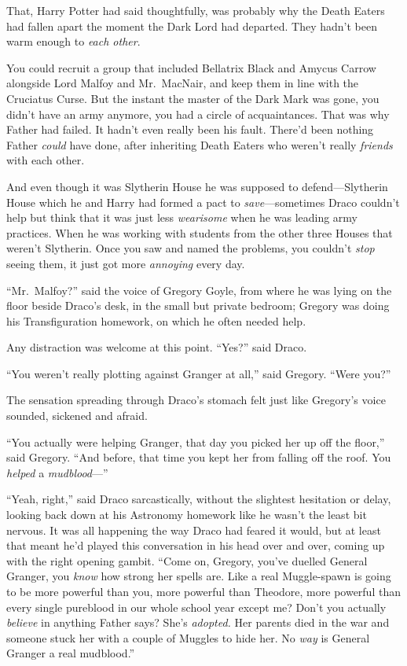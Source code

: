 That, Harry Potter had said thoughtfully, was probably why the Death
Eaters had fallen apart the moment the Dark Lord had departed. They
hadn't been warm enough to \emph{each other}.

You could recruit a group that included Bellatrix Black and Amycus
Carrow alongside Lord Malfoy and Mr.~MacNair, and keep them in line with
the Cruciatus Curse. But the instant the master of the Dark Mark was
gone, you didn't have an army anymore, you had a circle of
acquaintances. That was why Father had failed. It hadn't even really
been his fault. There'd been nothing Father \emph{could} have done,
after inheriting Death Eaters who weren't really \emph{friends} with
each other.

And even though it was Slytherin House he was supposed to
defend---Slytherin House which he and Harry had formed a pact to
\emph{save}---sometimes Draco couldn't help but think that it was just
less \emph{wearisome} when he was leading army practices. When he was
working with students from the other three Houses that weren't
Slytherin. Once you saw and named the problems, you couldn't \emph{stop}
seeing them, it just got more \emph{annoying} every day.

``Mr.~Malfoy?'' said the voice of Gregory Goyle, from where he was lying
on the floor beside Draco's desk, in the small but private bedroom;
Gregory was doing his Transfiguration homework, on which he often needed
help.

Any distraction was welcome at this point. ``Yes?'' said Draco.

``You weren't really plotting against Granger at all,'' said Gregory.
``Were you?''

The sensation spreading through Draco's stomach felt just like Gregory's
voice sounded, sickened and afraid.

``You actually were helping Granger, that day you picked her up off the
floor,'' said Gregory. ``And before, that time you kept her from falling
off the roof. You \emph{helped} a \emph{mudblood}---''

``Yeah, right,'' said Draco sarcastically, without the slightest
hesitation or delay, looking back down at his Astronomy homework like he
wasn't the least bit nervous. It was all happening the way Draco had
feared it would, but at least that meant he'd played this conversation
in his head over and over, coming up with the right opening gambit.
``Come on, Gregory, you've duelled General Granger, you \emph{know} how
strong her spells are. Like a real Muggle-spawn is going to be more
powerful than you, more powerful than Theodore, more powerful than every
single pureblood in our whole school year except me? Don't you actually
\emph{believe} in anything Father says? She's \emph{adopted.} Her
parents died in the war and someone stuck her with a couple of Muggles
to hide her. No \emph{way} is General Granger a real mudblood.''

